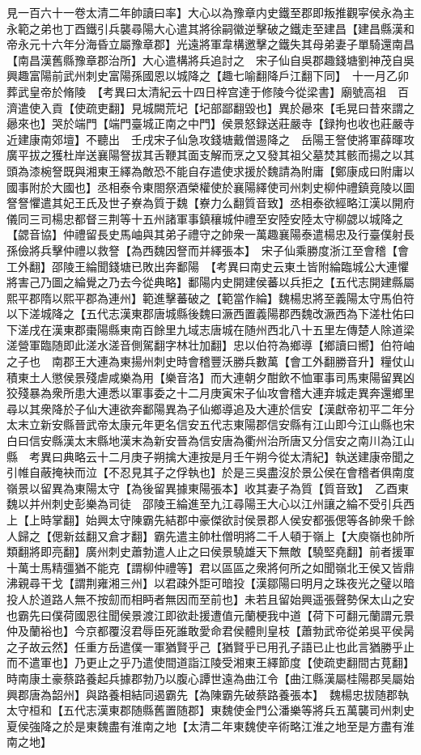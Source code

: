 見一百六十一卷太清二年帥讀曰率】大心以為豫章内史鐵至郡即叛推觀寜侯永為主永範之弟也丁酉鐵引兵襲尋陽大心遣其將徐嗣徽逆擊破之鐵走至建昌【建昌縣漢和帝永元十六年分海昏立屬豫章郡】光遠將軍韋構邀擊之鐵失其母弟妻子單騎還南昌【南昌漢舊縣豫章郡治所】大心遣構將兵追討之　宋子仙自吳郡趣錢塘劉神茂自吳興趣富陽前武州刺史富陽孫國恩以城降之【趣七喻翻降戶江翻下同】　十一月乙卯葬武皇帝於脩陵　【考異曰太清紀云十四日梓宫達于修陵今從梁書】廟號高祖　百濟遣使入貢【使疏吏翻】見城闕荒圮【圮部鄙翻毀也】異於曏來【毛晃曰昔來謂之曏來也】哭於端門【端門臺城正南之中門】侯景怒録送莊嚴寺【録拘也收也莊嚴寺近建康南郊壇】不聽出　壬戌宋子仙急攻錢塘戴僧逷降之　岳陽王詧使將軍薛暉攻廣平拔之獲杜岸送襄陽詧拔其舌鞭其面支解而烹之又發其祖父墓焚其骸而揚之以其頭為漆椀詧既與湘東王繹為敵恐不能自存遣使求援於魏請為附庸【鄭康成曰附庸以國事附於大國也】丞相泰令東閤祭酒榮權使於襄陽繹使司州刺史柳仲禮鎮竟陵以圖詧詧懼遣其妃王氏及世子嶚為質于魏【嶚力么翻質音致】丞相泰欲經略江漢以開府儀同三司楊忠都督三荆等十五州諸軍事鎮穰城仲禮至安陸安陸太守柳勰以城降之【勰音協】仲禮留長史馬岫與其弟子禮守之帥衆一萬趣襄陽泰遣楊忠及行臺僕射長孫儉將兵擊仲禮以救詧【為西魏因詧而并繹張本】　宋子仙乘勝度浙江至會稽【會工外翻】邵陵王綸聞錢塘已敗出奔鄱陽　【考異曰南史云東土皆附綸臨城公大連懼將害己乃圖之綸覺之乃去今從典略】鄱陽内史開建侯蕃以兵拒之【五代志開建縣屬熙平郡隋以熙平郡為連州】範進擊蕃破之【範當作綸】魏楊忠將至義陽太守馬伯符以下溠城降之【五代志漢東郡唐城縣後魏曰㵐西置義陽郡西魏改㵐西為下溠杜佑曰下溠戌在漢東郡棗陽縣東南百餘里九域志唐城在随州西北八十五里左傳楚人除道梁溠營軍臨随即此溠水溠音側駕翻字林壮加翻】忠以伯符為鄉導【鄉讀曰嚮】伯符岫之子也　南郡王大連為東揚州刺史時會稽豐沃勝兵數萬【會工外翻勝音升】糧仗山積東土人懲侯景殘虐咸樂為用【樂音洛】而大連朝夕酣飲不恤軍事司馬東陽留異凶狡殘暴為衆所患大連悉以軍事委之十二月庚寅宋子仙攻會稽大連弃城走異奔還鄉里尋以其衆降於子仙大連欲奔鄱陽異為子仙鄉導追及大連於信安【漢獻帝初平二年分太末立新安縣晉武帝太康元年更名信安五代志東陽郡信安縣有江山即今江山縣也宋白曰信安縣漢太末縣地漢末為新安晉為信安唐為衢州治所唐又分信安之南川為江山縣　考異曰典略云十二月庚子朔擒大連按是月壬午朔今從太清紀】執送建康帝聞之引帷自蔽掩袂而泣【不忍見其子之俘執也】於是三吳盡沒於景公侯在會稽者俱南度嶺景以留異為東陽太守【為後留異據東陽張本】收其妻子為質【質音致】　乙酉東魏以并州刺史彭樂為司徒　邵陵王綸進至九江尋陽王大心以江州讓之綸不受引兵西上【上時掌翻】始興太守陳霸先結郡中豪傑欲討侯景郡人侯安都張偲等各帥衆千餘人歸之【偲新兹翻又倉才翻】霸先遣主帥杜僧明將二千人頓于嶺上【大庾嶺也帥所類翻將即亮翻】廣州刺史蕭勃遣人止之曰侯景驍雄天下無敵【驍堅堯翻】前者援軍十萬士馬精彊猶不能克【謂柳仲禮等】君以區區之衆將何所之如聞嶺北王侯又皆鼎沸親尋干戈【謂荆雍湘三州】以君疎外詎可暗投【漢鄒陽曰明月之珠夜光之璧以暗投人於道路人無不按劎而相眄者無因而至前也】未若且留始興遥張聲勢保太山之安也霸先曰僕荷國恩往聞侯景渡江即欲赴援遭值元蘭梗我中道【荷下可翻元蘭謂元景仲及蘭裕也】今京都覆沒君辱臣死誰敢愛命君侯體則皇枝【蕭勃武帝從弟吳平侯昺之子故云然】任重方岳遣僕一軍猶賢乎己【猶賢乎已用孔子語已止也此言猶勝乎止而不遣軍也】乃更止之乎乃遣使間道詣江陵受湘東王繹節度【使疏吏翻間古莧翻】時南康土豪蔡路養起兵據郡勃乃以腹心譚世遠為曲江令【曲江縣漢屬桂陽郡吴屬始興郡唐為韶州】與路養相結同遏霸先【為陳霸先破蔡路養張本】　魏楊忠拔随郡執太守桓和【五代志漢東郡随縣舊置随郡】東魏使金門公潘樂等將兵五萬襲司州刺史夏侯強降之於是東魏盡有淮南之地【太清二年東魏使辛術略江淮之地至是方盡有淮南之地】

